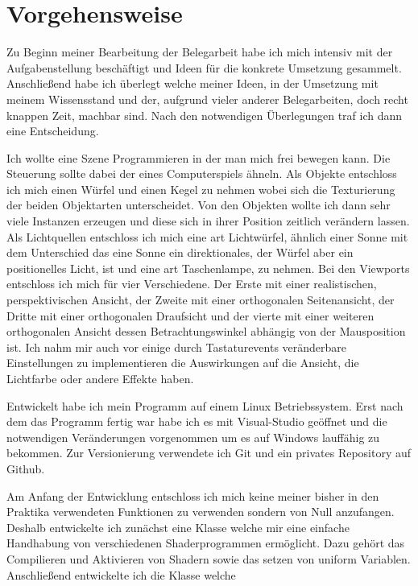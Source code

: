 \documentclass{article}
\begin{document}
\section{Vorgehensweise}
Zu Beginn meiner Bearbeitung der Belegarbeit habe ich mich intensiv mit der Aufgabenstellung beschäftigt und Ideen
für die konkrete Umsetzung gesammelt. Anschließend habe ich überlegt welche meiner Ideen, in der Umsetzung mit meinem
Wissensstand und der, aufgrund vieler anderer Belegarbeiten, doch recht knappen Zeit, machbar sind.
Nach den notwendigen Überlegungen traf ich dann eine Entscheidung.\par
\medskip
Ich wollte eine Szene Programmieren in der man mich frei bewegen kann. Die Steuerung sollte dabei der eines
Computerspiels ähneln. Als Objekte entschloss ich mich einen Würfel und einen Kegel zu nehmen wobei sich die
Texturierung der beiden Objektarten unterscheidet. Von den Objekten wollte ich dann sehr viele Instanzen erzeugen und diese
sich in ihrer Position zeitlich verändern lassen. Als Lichtquellen entschloss ich mich eine art Lichtwürfel, ähnlich einer
Sonne mit dem Unterschied das eine Sonne ein direktionales, der Würfel aber ein positionelles Licht, ist und eine
art Taschenlampe, zu nehmen. Bei den Viewports entschloss ich mich für vier Verschiedene. Der Erste mit einer realistischen, 
perspektivischen Ansicht, der Zweite mit einer orthogonalen Seitenansicht, der Dritte mit einer orthogonalen
Draufsicht und der vierte mit einer weiteren orthogonalen Ansicht dessen Betrachtungswinkel abhängig von der Mausposition ist.
Ich nahm mir auch vor einige durch Tastaturevents veränderbare Einstellungen zu implementieren die Auswirkungen auf die
Ansicht, die Lichtfarbe oder andere Effekte haben.\par
\medskip
Entwickelt habe ich mein Programm auf einem Linux Betriebssystem. Erst nach dem das Programm fertig war habe ich es
mit Visual-Studio geöffnet und die notwendigen Veränderungen vorgenommen um es auf Windows lauffähig zu bekommen.
Zur Versionierung verwendete ich Git und ein privates Repository auf Github.\par
\medskip
Am Anfang der Entwicklung entschloss ich mich keine meiner bisher in den Praktika verwendeten Funktionen zu verwenden
sondern von Null anzufangen. Deshalb entwickelte ich zunächst eine Klasse  welche mir eine einfache
Handhabung von verschiedenen Shaderprogrammen ermöglicht. Dazu gehört das Compilieren und
Aktivieren von Shadern sowie das setzen von uniform Variablen. Anschließend entwickelte ich die Klasse  welche
\end{document}
